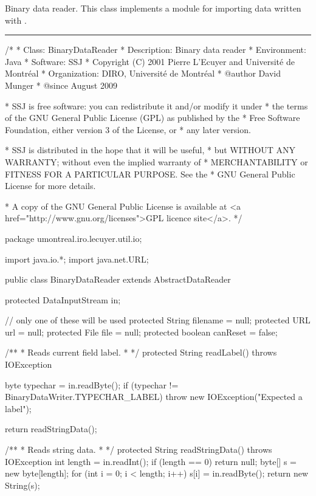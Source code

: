 
Binary data reader. This class implements a module for importing data written
 with .

\bigskip\hrule

\begin{code}
\begin{hide}
/*
 * Class:        BinaryDataReader
 * Description:  Binary data reader
 * Environment:  Java
 * Software:     SSJ 
 * Copyright (C) 2001  Pierre L'Ecuyer and Université de Montréal
 * Organization: DIRO, Université de Montréal
 * @author       David Munger 
 * @since        August 2009

 * SSJ is free software: you can redistribute it and/or modify it under
 * the terms of the GNU General Public License (GPL) as published by the
 * Free Software Foundation, either version 3 of the License, or
 * any later version.

 * SSJ is distributed in the hope that it will be useful,
 * but WITHOUT ANY WARRANTY; without even the implied warranty of
 * MERCHANTABILITY or FITNESS FOR A PARTICULAR PURPOSE.  See the
 * GNU General Public License for more details.

 * A copy of the GNU General Public License is available at
   <a href="http://www.gnu.org/licenses">GPL licence site</a>.
 */
\end{hide}
package umontreal.iro.lecuyer.util.io;\begin{hide}
import java.io.*;
import java.net.URL;
\end{hide}


public class BinaryDataReader extends AbstractDataReader \begin{hide} {
   protected DataInputStream in;
   
   // only one of these will be used
   protected String filename           = null;
   protected URL url                   = null;
   protected File file                 = null;
   protected boolean canReset = false;

   /**
    * Reads current field label.
    *
    */
   protected String readLabel() throws IOException {

      byte typechar = in.readByte();
      if (typechar != BinaryDataWriter.TYPECHAR_LABEL)
         throw new IOException("Expected a label");

      return readStringData();
   }


   /**
    * Reads string data.
    *
    */    
   protected String readStringData() throws IOException {
      int length = in.readInt();
      if (length == 0)
         return null;
      byte[] s = new byte[length];
      for (int i = 0; i < length; i++)
         s[i] = in.readByte();
      return new String(s);
   }
      
}
\end{hide}
\end{code}
